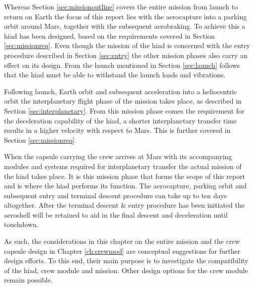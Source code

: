 Whereas Section \ref{sec:missionoutline} covers the entire mission from launch to return on Earth the focus of this report lies with the aerocapture into a parking orbit around Mars, together with the subsequent aerobraking. To achieve this a \gls{hiad} has been designed, based on the requirements covered in Section \ref{sec:missionreq}. Even though the mission of the \gls{hiad} is concerned with the entry procedure described in Section \ref{sec:entry} the other mission phases also carry an effect on its design. From the launch mentioned in Section \ref{sec:launch} follows that the \gls{hiad} must be able to withstand the launch loads and vibrations. 

Following launch, Earth orbit and subsequent acceleration into a heliocentric orbit the interplanetary flight phase of the mission takes place, as described in Section \ref{sec:interplanetary}. From this mission phase comes the requirement for the deceleration capability of the \gls{hiad}, a shorter interplanetary transfer time results in a higher velocity with respect to Mars. This is further covered in Section \ref{sec:missionreq}. 

When the capsule carrying the crew arrives at Mars with its accompanying modules and systems required for interplanetary transfer the actual mission of the \gls{hiad} takes place. It is this mission phase that forms the scope of this report and is where the \gls{hiad} performs its function. The aerocapture, parking orbit and subsequent entry and terminal descent procedure can take up to ten days altogether. After the terminal descent \& entry procedure has been initiated the aeroshell will be retained to aid in the final descent and deceleration until touchdown.

As such, the considerations in this chapter on the entire mission and the crew capsule design in Chapter \ref{ch:crewmod} are conceptual suggestions for further design efforts. To this end, their main purpose is to investigate the compatibility of the \gls{hiad}, crew module and mission. Other design options for the crew module remain possible.